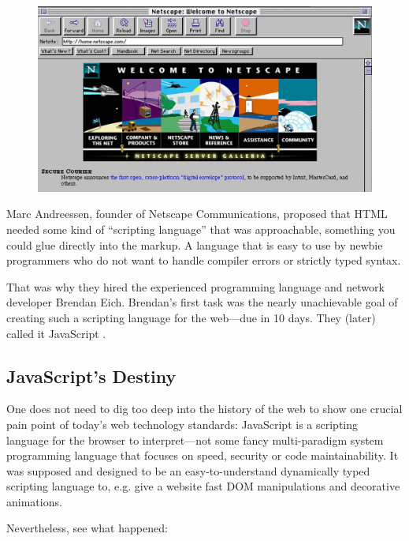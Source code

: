 \documentclass[10pt]{article}
\begin{document}
\begin{sloppypar}
  \begin{figure}[ht]
    \centering
    \includegraphics[width=\textwidth]{figures/netscape.jpg}
    \label{fig:netscape}
  \end{figure}

  Marc Andreessen, founder of Netscape Communications, proposed that HTML needed some kind of “scripting language” that was approachable, something you could glue directly into the markup. A language that is easy to use by newbie programmers who do not want to handle compiler errors or strictly typed syntax.

  That was why they hired the experienced programming language and network developer Brendan Eich. Brendan’s first task was the nearly unachievable goal of creating such a scripting language for the web—due in 10 days. They (later) called it JavaScript \citep{severance_javascript_2012}.

  \subsection{JavaScript’s Destiny}
  \label{sec:javascript-destiny}

  One does not need to dig too deep into the history of the web to show one crucial pain point of today’s web technology standards: JavaScript is a scripting language for the browser to interpret—not some fancy multi-paradigm system programming language that focuses on speed, security or code maintainability. It was supposed and designed to be an easy-to-understand dynamically typed scripting language to, e.g. give a website fast DOM manipulations and decorative animations.

  Nevertheless, see what happened:


\end{sloppypar}
\end{document}

